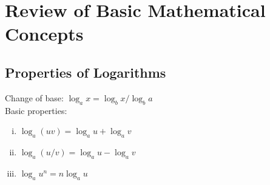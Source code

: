 \documentclass{article}
\begin{document}
	\appendix

	\section{Review of Basic Mathematical Concepts}
		\subsection{Properties of Logarithms}
			Change of base: $\log_a x = \log_b x/\log_b a$ \\
			Basic properties:
			\begin{enumerate}[(i)]
				\item $\log_a(uv) = \log_a u + \log_a v$
				\item $\log_a(u / v) = \log_a u - \log_a v$
				\item $\log_a u^n = n \log_a u$
				\end{enumerate}



	
\end{document}
